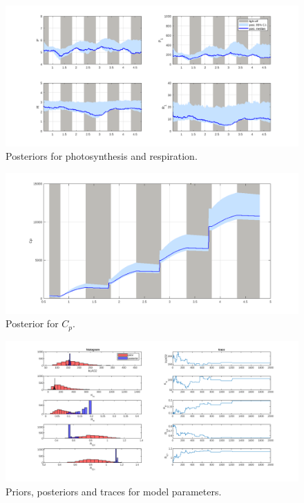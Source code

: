 \documentclass{ruthesis}
\begin{document}
\begin{figure}
	\centerline{\includegraphics[width=1.2\textwidth]{images_microalgae/plots/P_and_R}}
	\caption[.]{Posteriors for photosynthesis and respiration.}
	\label{fig:pos_P_R}
\end{figure}

\begin{figure}
	\centerline{\includegraphics[width=1.2\textwidth]{images_microalgae/plots/Cp}}
	\caption[.]{Posterior for $C_p$.}
	\label{fig:pos_Cp}
\end{figure}

\begin{figure}
	\centerline{\includegraphics[width=1.3\textwidth]{images_microalgae/plots/parameters_model}}
	\caption[.]{Priors, posteriors and traces for model parameters.}
	\label{fig:pos_parameters_model}
\end{figure}
\end{document}
